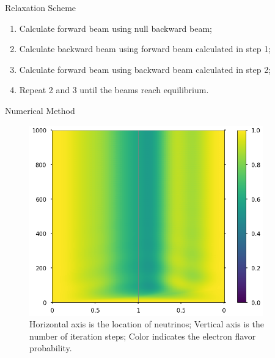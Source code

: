 \begin{frame}{Relaxation Scheme}

\begin{tcolorbox}[title=Algorithm,standard jigsaw,
    opacityback=0]
   \begin{enumerate}
      \item Calculate forward beam using null backward beam;
      \item Calculate backward beam using forward beam calculated in step 1;
      \item Calculate forward beam using backward beam calculated in step 2;
      \item Repeat 2 and 3 until the beams reach equilibrium.
   \end{enumerate}
\end{tcolorbox}




\end{frame}




\begin{frame}{Numerical Method}

\begin{tcolorbox}
\begin{figure}
   \includegraphics[width=0.9\textwidth]{assets/relax-color}
   \caption*{\color{black}Horizontal axis is the location of neutrinos; Vertical axis is the number of iteration steps; Color indicates the electron flavor probability.}
\end{figure}
\end{tcolorbox}

\end{frame}


